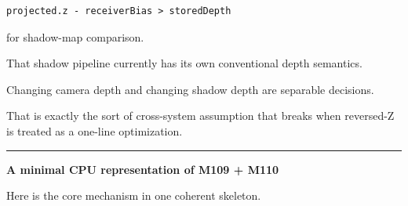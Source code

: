 \begin{verbatim}
projected.z - receiverBias > storedDepth
\end{verbatim}

for shadow-map comparison.

That shadow pipeline currently has its own conventional depth semantics.

Changing camera depth and changing shadow depth are separable decisions.

That is exactly the sort of cross-system assumption that breaks when reversed-Z is treated as a one-line optimization.

\begin{center}\rule{0.5\linewidth}{0.5pt}\end{center}

\textbf{A minimal CPU representation of M109 + M110}

Here is the core mechanism in one coherent skeleton.

